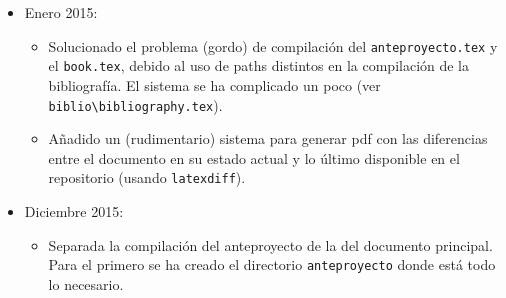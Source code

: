 \documentclass[spanish,openright]{book}
\begin{document}
\begin{appendices}
\begin{itemize}
\item Enero 2015:
\begin{itemize}
\item Solucionado el problema (gordo) de compilación del
\texttt{anteproyecto.tex} y el \texttt{book.tex}, debido al uso de
paths distintos en la compilación de la bibliografía. El sistema se ha
complicado un poco (ver
\texttt{biblio\textbackslash{}bibliography.tex}).
\item Añadido un (rudimentario) sistema para generar pdf con las
diferencias entre el documento en su estado actual y lo último
disponible en el repositorio (usando \texttt{latexdiff}).
\end{itemize}
\item Diciembre 2015:
\begin{itemize}
\item Separada la compilación del anteproyecto de la del documento
principal. Para el primero se ha creado el directorio
\texttt{anteproyecto} donde está todo lo necesario.
\end{itemize}
\end{itemize}




\end{appendices}


\backmatter
\end{document}
